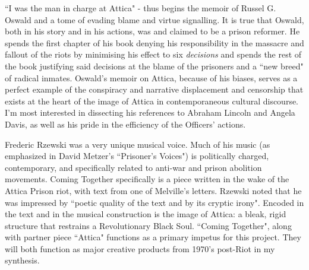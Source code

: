 \documentclass[14pt, letterpaper]{article}
\begin{document}

\begin{adjustwidth}{2.5ex}{0pt}

  ``I was the man in charge at Attica" - thus begins the memoir 
  of Russel G. Oswald and a tome of evading blame and virtue 
  signalling. It is true that Oswald, both in his story and in 
  his actions, was and claimed to be a prison reformer. He spends 
  the first chapter of his book denying his responsibility in the 
  massacre and fallout of the riots by minimising his effect to 
  six \textit{decisions} and spends the rest of the book justifying 
  said decisions at the blame of the prisoners and a ``new breed" of 
  radical inmates. Oswald's memoir on Attica, because of his biases, 
  serves as a perfect example of the conspiracy and narrative 
  displacement and censorship that exists at the heart of the image of 
  Attica in contemporaneous cultural discourse. I'm most interested in 
  dissecting his references to Abraham Lincoln and Angela Davis, as well 
  as his pride in the efficiency of the Officers' actions. 

\end{adjustwidth}


\clearpage


\begin{adjustwidth}{2.5ex}{0pt}

  Frederic Rzewski was a very unique musical voice. Much of his music 
  (as emphasized in David Metzer's ``Prisoner's Voices") is politically 
  charged, contemporary, and specifically related to anti-war and 
  prison abolition movements. Coming Together specifically is a piece 
  written in the wake of the Attica Prison riot, with text from one 
  of Melville's letters. Rzewski noted that he was impressed by 
  ``poetic quality of the text and by its cryptic irony". Encoded 
  in the text and in the musical construction is the image of Attica: 
  a bleak, rigid structure that restrains a Revolutionary Black Soul. 
  ``Coming Together", along with partner piece ``Attica" functions as 
  a primary impetus for this project. They will both function as major 
  creative products from 1970's post-Riot in my synthesis. 

\end{adjustwidth}

\clearpage

\end{document}
